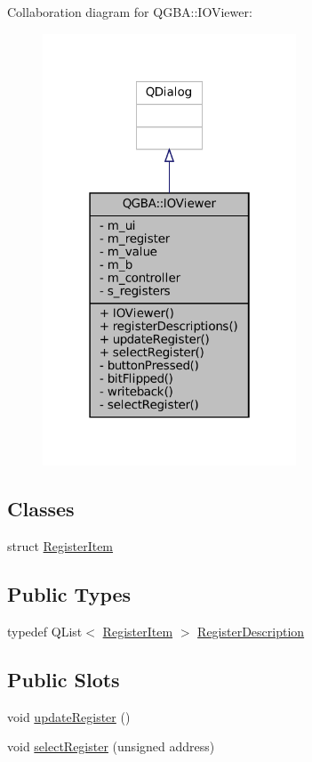 Collaboration diagram for Q\+G\+BA\+:\+:I\+O\+Viewer\+:
\nopagebreak
\begin{figure}[H]
\begin{center}
\leavevmode
\includegraphics[width=214pt]{class_q_g_b_a_1_1_i_o_viewer__coll__graph}
\end{center}
\end{figure}
\subsection*{Classes}
\begin{DoxyCompactItemize}
\item 
struct \mbox{\hyperlink{struct_q_g_b_a_1_1_i_o_viewer_1_1_register_item}{Register\+Item}}
\end{DoxyCompactItemize}
\subsection*{Public Types}
\begin{DoxyCompactItemize}
\item 
typedef Q\+List$<$ \mbox{\hyperlink{struct_q_g_b_a_1_1_i_o_viewer_1_1_register_item}{Register\+Item}} $>$ \mbox{\hyperlink{class_q_g_b_a_1_1_i_o_viewer_ac2099e64016757f9d1162bab33cf51bf}{Register\+Description}}
\end{DoxyCompactItemize}
\subsection*{Public Slots}
\begin{DoxyCompactItemize}
\item 
void \mbox{\hyperlink{class_q_g_b_a_1_1_i_o_viewer_a2e75eb25e921d6cecdda851ea81eaf48}{update\+Register}} ()
\item 
void \mbox{\hyperlink{class_q_g_b_a_1_1_i_o_viewer_a7ea54cf288ddfc8246a3c41681114b8d}{select\+Register}} (unsigned address)
\end{DoxyCompactItemize}
